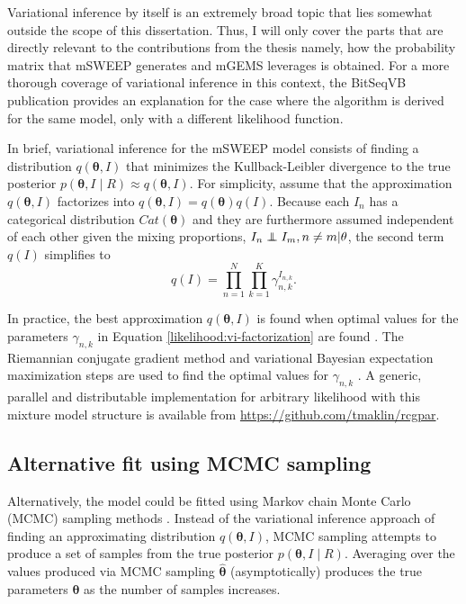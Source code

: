 \documentclass[officiallayout]{tktla}
\newcommand\indept{\protect\mathpalette{\protect\independenT}{\perp}}
\def\independenT#1#2{\mathrel{\rlap{$#1#2$}\mkern2mu{#1#2}}}
\begin{document}
Variational inference by itself is an extremely broad topic that lies
somewhat outside the scope of this dissertation. Thus, I will only
cover the parts that are directly relevant to the contributions from
the thesis \textemdash{ } namely, how the probability matrix that mSWEEP
generates and mGEMS leverages is obtained. For a more thorough
coverage of variational inference in this context, the BitSeqVB publication
\citep{hensman2015fast} provides an explanation for the case where the
algorithm is derived for the same model, only with a different
likelihood function.

In brief, variational inference for the mSWEEP model
\citep{hensman2012fast} consists of finding a distribution
$q\left(\boldsymbol\theta, I\right)$ that minimizes the
Kullback-Leibler divergence to the true posterior
$p\left(\boldsymbol\theta, I \middle| R\right) \approx
q\left(\boldsymbol\theta, I\right)$. For simplicity, assume that the
approximation $q\left(\boldsymbol\theta, I\right)$ factorizes into
$q\left(\boldsymbol\theta, I\right) =
q\left(\boldsymbol\theta\right)q\left(I\right)$. Because each $I_{n}$
has a categorical distribution $Cat\left(\boldsymbol\theta\right)$ and
they are furthermore assumed independent of each other given the
mixing proportions, $I_{n} \indept I_{m}, n \neq m |
\mathbf{\theta}$, the second term $q\left(I\right)$ simplifies to
\begin{equation}
  \label{likelihood:vi-factorization}
  q\left(I\right) = \prod_{n = 1}^N\prod_{k = 1}^K \gamma_{n, k}^{I_{n, k}}.
\end{equation}

In practice, the best approximation $q\left(\boldsymbol\theta,
I\right)$ is found when optimal values for the parameters $\gamma_{n,
  k}$ in Equation \eqref{likelihood:vi-factorization} are found
\citep{hensman2015fast}. The Riemannian conjugate gradient
method and variational Bayesian expectation maximization steps are
used to find the optimal values for $\gamma_{n, k}$
\citep{hensman2015fast, hensman2012fast, honkela2010approximate}. A
generic, parallel and distributable implementation for arbitrary
likelihood with this mixture model structure is available from
\url{https://github.com/tmaklin/rcgpar}.

\subsection{Alternative fit using MCMC sampling}
Alternatively, the model could be fitted using Markov chain Monte
Carlo (MCMC) sampling methods \citep{glaus2012identifying}. Instead of
the variational inference approach of finding an approximating
distribution $q\left(\boldsymbol\theta, I\right)$, MCMC sampling
attempts to produce a set of samples from the true posterior
$p\left(\boldsymbol\theta, I\middle| R\right)$. Averaging over the
values produced via MCMC sampling $\hat{\boldsymbol\theta}$
(asymptotically) produces the true parameters $\boldsymbol\theta$ as
the number of samples increases.
\end{document}
